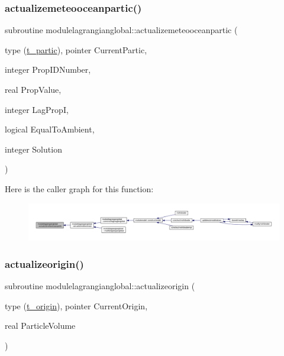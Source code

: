 \subsubsection{\texorpdfstring{actualizemeteooceanpartic()}{actualizemeteooceanpartic()}}
{\footnotesize\ttfamily subroutine modulelagrangianglobal\+::actualizemeteooceanpartic (\begin{DoxyParamCaption}\item[{type (\mbox{\hyperlink{structmodulelagrangianglobal_1_1t__partic}{t\+\_\+partic}}), pointer}]{Current\+Partic,  }\item[{integer}]{Prop\+I\+D\+Number,  }\item[{real}]{Prop\+Value,  }\item[{integer}]{Lag\+PropI,  }\item[{logical}]{Equal\+To\+Ambient,  }\item[{integer}]{Solution }\end{DoxyParamCaption})\hspace{0.3cm}{\ttfamily [private]}}

Here is the caller graph for this function\+:\nopagebreak
\begin{figure}[H]
\begin{center}
\leavevmode
\includegraphics[width=350pt]{namespacemodulelagrangianglobal_ae28614950d33d82496f705c7601b8d28_icgraph}
\end{center}
\end{figure}
\mbox{\label{namespacemodulelagrangianglobal_a2922324362ebb3dd949bc869b16e90b9}} 
\subsubsection{\texorpdfstring{actualizeorigin()}{actualizeorigin()}}
{\footnotesize\ttfamily subroutine modulelagrangianglobal\+::actualizeorigin (\begin{DoxyParamCaption}\item[{type (\mbox{\hyperlink{structmodulelagrangianglobal_1_1t__origin}{t\+\_\+origin}}), pointer}]{Current\+Origin,  }\item[{real}]{Particle\+Volume }\end{DoxyParamCaption})\hspace{0.3cm}{\ttfamily [private]}}

